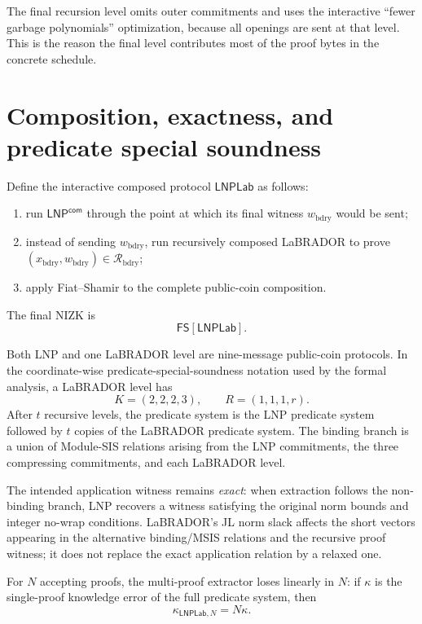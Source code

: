 \documentclass[11pt,a4paper]{article}
\newcommand{\LNPcom}{\mathsf{LNP}^{\mathsf{com}}}
\newcommand{\LNPLab}{\mathsf{LNPLab}}
\newcommand{\FS}{\mathsf{FS}}
\newcommand{\calR}{\mathcal{R}}
\begin{document}
The final recursion level omits outer commitments and uses the interactive
``fewer garbage polynomials'' optimization, because all openings are sent at
that level.  This is the reason the final level contributes most of the proof
bytes in the concrete schedule.

\section{Composition, exactness, and predicate special soundness}

Define the interactive composed protocol \(\LNPLab\) as follows:
\begin{enumerate}
  \item run \(\LNPcom\) through the point at which its final witness
  \(w_{\mathrm{bdry}}\) would be sent;
  \item instead of sending \(w_{\mathrm{bdry}}\), run recursively composed
  LaBRADOR to prove
  \((x_{\mathrm{bdry}},w_{\mathrm{bdry}})\in\calR_{\mathrm{bdry}}\);
  \item apply Fiat--Shamir to the complete public-coin composition.
\end{enumerate}
The final NIZK is
\[
  \FS[\LNPLab].
\]

Both LNP and one LaBRADOR level are nine-message public-coin protocols.  In the
coordinate-wise predicate-special-soundness notation used by the formal
analysis, a LaBRADOR level has
\[
  K=(2,2,2,3),\qquad R=(1,1,1,r).
\]
After \(t\) recursive levels, the predicate system is the LNP predicate system
followed by \(t\) copies of the LaBRADOR predicate system.  The binding branch
is a union of Module-SIS relations arising from the LNP commitments, the three
compressing commitments, and each LaBRADOR level.

The intended application witness remains \emph{exact}: when extraction follows
the non-binding branch, LNP recovers a witness satisfying the original norm
bounds and integer no-wrap conditions.  LaBRADOR's JL norm slack affects the
short vectors appearing in the alternative binding/MSIS relations and the
recursive proof witness; it does not replace the exact application relation by
a relaxed one.

For \(N\) accepting proofs, the multi-proof extractor loses linearly in \(N\):
if \(\kappa\) is the single-proof knowledge error of the full predicate system,
then
\[
  \kappa_{\LNPLab,N}=N\kappa.
\]
\end{document}
